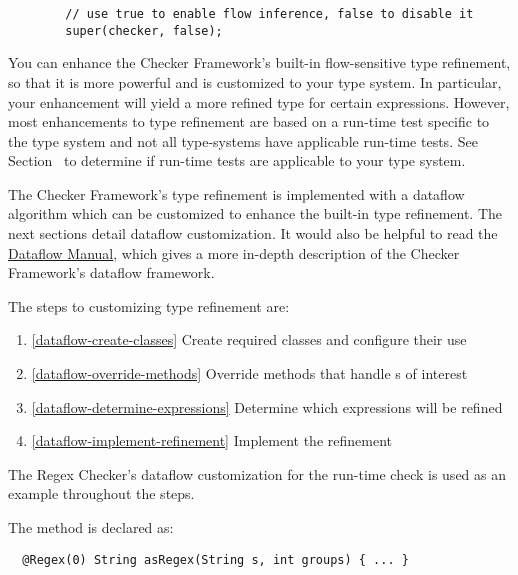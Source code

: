 \begin{Verbatim}
        // use true to enable flow inference, false to disable it
        super(checker, false);
\end{Verbatim}

You can enhance the Checker Framework's built-in flow-sensitive type refinement,
so that it is more powerful and is customized to your type system. In
particular, your enhancement will yield a more refined type for certain
expressions. However, most enhancements to type refinement are based on a
run-time test specific to the type system and not all type-systems have
applicable run-time tests.  See
Section~ to determine if
run-time tests are applicable to your type system.

The Checker Framework's type refinement is implemented with a dataflow algorithm
which can be customized to enhance the built-in type refinement. The next
sections detail dataflow customization.  It would also be helpful to read the
\href{http://types.cs.washington.edu/checker-framework/current/checker-framework-dataflow-manual.pdf}
{Dataflow Manual}, which gives a more in-depth description of the Checker
Framework's dataflow framework.

The steps to customizing type refinement are:
\begin{enumerate}
\item{\ref{dataflow-create-classes}} Create required classes and configure their
    use
\item{\ref{dataflow-override-methods}} Override methods that handle
    s of interest
\item{\ref{dataflow-determine-expressions}} Determine which expressions will be
    refined
\item{\ref{dataflow-implement-refinement}} Implement the refinement
\end{enumerate}

The Regex Checker's dataflow customization for the 
run-time check is used as an example throughout the steps.

The  method is declared as:

\begin{smaller}
\begin{Verbatim}
  @Regex(0) String asRegex(String s, int groups) { ... }
\end{Verbatim}
\end{smaller}

